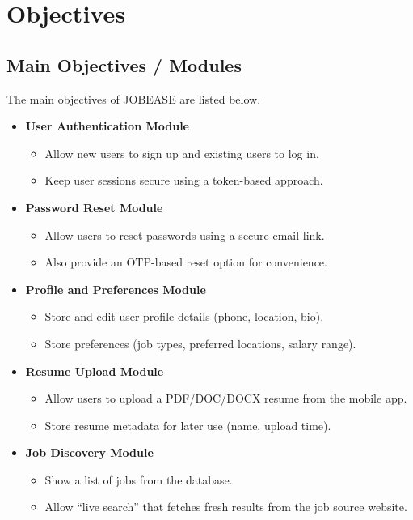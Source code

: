 \documentclass[12pt,a4paper]{report}
\begin{document}
\chapter{Objectives}
\section*{Main Objectives / Modules}

\noindent
The main objectives of JOBEASE are listed below.

\begin{itemize}[leftmargin=*, itemsep=6pt]
  \item \textbf{User Authentication Module}
  \begin{itemize}[leftmargin=*, itemsep=4pt]
    \item Allow new users to sign up and existing users to log in.
    \item Keep user sessions secure using a token-based approach.
  \end{itemize}

  \item \textbf{Password Reset Module}
  \begin{itemize}[leftmargin=*, itemsep=4pt]
    \item Allow users to reset passwords using a secure email link.
    \item Also provide an OTP-based reset option for convenience.
  \end{itemize}

  \item \textbf{Profile and Preferences Module}
  \begin{itemize}[leftmargin=*, itemsep=4pt]
    \item Store and edit user profile details (phone, location, bio).
    \item Store preferences (job types, preferred locations, salary range).
  \end{itemize}

  \item \textbf{Resume Upload Module}
  \begin{itemize}[leftmargin=*, itemsep=4pt]
    \item Allow users to upload a PDF/DOC/DOCX resume from the mobile app.
    \item Store resume metadata for later use (name, upload time).
  \end{itemize}

  \item \textbf{Job Discovery Module}
  \begin{itemize}[leftmargin=*, itemsep=4pt]
    \item Show a list of jobs from the database.
    \item Allow ``live search'' that fetches fresh results from the job source website.
  \end{itemize}


\end{itemize}
\end{document}
